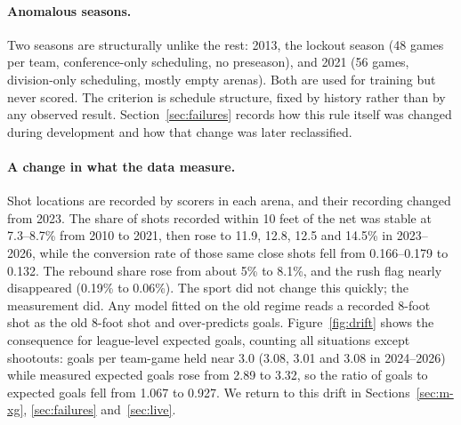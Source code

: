 \paragraph{Anomalous seasons.}
Two seasons are structurally unlike the rest: 2013, the lockout season (48
games per team, conference-only scheduling, no preseason), and 2021 (56 games,
division-only scheduling, mostly empty arenas). Both are used for training but
never scored. The criterion is schedule structure, fixed by history rather
than by any observed result. Section~\ref{sec:failures} records how this rule
itself was changed during development and how that change was later
reclassified.

\paragraph{A change in what the data measure.}
Shot locations are recorded by scorers in each arena, and their recording
changed from 2023. The share of shots recorded within 10 feet of the net was
stable at 7.3--8.7\% from 2010 to 2021, then rose to 11.9, 12.8, 12.5 and 14.5\%
in 2023--2026, while the conversion rate of those same close shots fell from
0.166--0.179 to 0.132. The rebound share rose from about 5\% to 8.1\%, and the
rush flag nearly disappeared (0.19\% to 0.06\%). The sport did not change this
quickly; the measurement did. Any model fitted on the old regime reads a
recorded 8-foot shot as the old 8-foot shot and over-predicts goals.
Figure~\ref{fig:drift} shows the consequence for league-level expected goals,
counting all situations except shootouts: goals per team-game held near 3.0
(3.08, 3.01 and 3.08 in 2024--2026) while measured expected goals rose from 2.89
to 3.32, so the ratio of goals to expected goals fell from 1.067 to 0.927. We
return to this drift in Sections~\ref{sec:m-xg}, \ref{sec:failures}
and~\ref{sec:live}.

